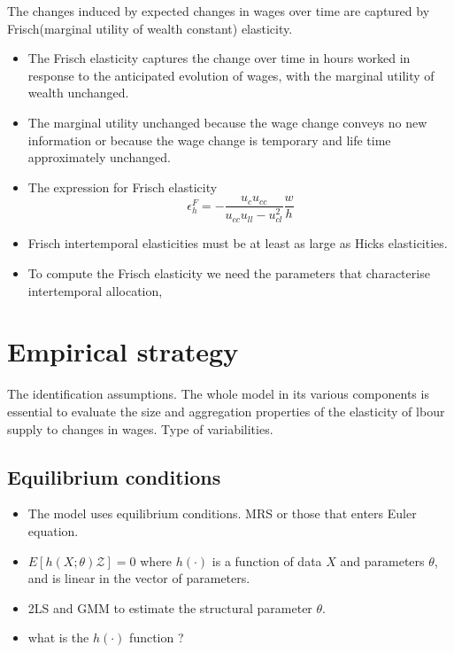 The changes induced by expected changes in wages over time are captured by Frisch(marginal utility of wealth constant) elasticity.

\begin{itemize}
    \item The Frisch elasticity captures the change over time in hours worked in response to the anticipated evolution of wages, with the marginal utility of wealth unchanged.
    \item The marginal utility unchanged because the wage change conveys no new information or because the wage change is temporary and life time approximately unchanged.
    \item The expression for Frisch elasticity \[ \epsilon_h^F = - \frac{u_c u_{cc}}{u_{cc} u_{ll} - u_{cl}^2} \frac{w}{h} \]
    \item Frisch intertemporal elasticities must be at least as large as Hicks elasticities.
    \item To compute the Frisch elasticity we need the parameters that characterise intertemporal allocation,
\end{itemize}

\section{Empirical strategy}
The identification assumptions.
The whole model in its various components is essential to evaluate the size and aggregation properties of the elasticity of lbour supply to changes in wages.
Type of variabilities.
\subsection{Equilibrium conditions}
\begin{itemize}
    \item The model uses equilibrium conditions. MRS or those that enters Euler equation.
    \item $ E[h(X;\theta) \mathcal{Z}] = 0 $ where $h(\cdot)$ is a function of data $X$ and parameters $\theta$, and is linear in the vector of parameters.
    \item 2LS and GMM to estimate the structural parameter $\theta$.
    \item {\color{red} what is the $h(\cdot)$ function ?}
\end{itemize}

